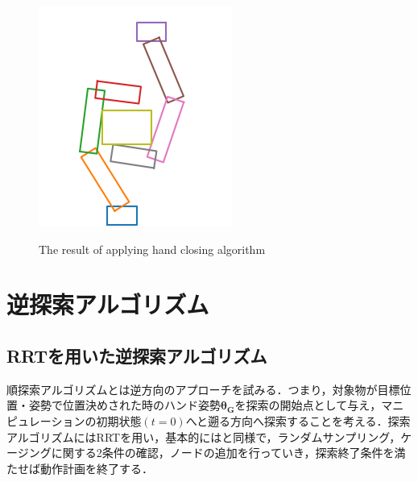 \documentclass[a4paper,twoside,12pt,papersize, dvipdfmx]{iirthesis}
\begin{document}
\begin{figure}[b]
\begin{minipage}{0.33\hsize}
\label{fig::planner::afterfclr}
\end{minipage}\hfill
\begin{minipage}{0.33\hsize}
\includegraphics[width=0.9\hsize]{fig/3-new-planner/rec_FC_right_left.png}
\label{fig::planner::afterfcrl}
\end{minipage}
\caption{The result of applying hand closing algorithm}\label{fig::planner::fc}
\end{figure}

\section{逆探索アルゴリズム}\label{sec::planner::reverse}
\subsection{RRTを用いた逆探索アルゴリズム}
順探索アルゴリズムとは逆方向のアプローチを試みる．つまり，対象物が目標位置・姿勢で位置決めされた時のハンド姿勢$\bm{\theta_G}$を探索の開始点として与え，マニピュレーションの初期状態$(t=0)$へと遡る方向へ探索することを考える．探索アルゴリズムにはRRTを用い，基本的にはと同様で，ランダムサンプリング，ケージングに関する2条件の確認，ノードの追加を行っていき，探索終了条件を満たせば動作計画を終了する．
\end{document}
